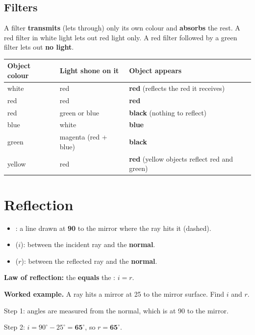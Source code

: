 \documentclass[11pt]{article}
\begin{document}
\subsection*{Filters}
A filter \textbf{transmits} (lets through) only its own colour and \textbf{absorbs} the rest. A red filter in white light lets out red light only. A red filter followed by a green filter lets out \textbf{no light}.
\begin{center}\FigFilter[5mm]\end{center}
\begin{tabularx}{\textwidth}{@{}l l X@{}}
\toprule
\textbf{Object colour} & \textbf{Light shone on it} & \textbf{Object appears}\\
\midrule
white & red & \textbf{red} (reflects the red it receives)\\
red & red & \textbf{red}\\
red & green or blue & \textbf{black} (nothing to reflect)\\
blue & white & \textbf{blue}\\
green & magenta (red + blue) & \textbf{black}\\
yellow & red & \textbf{red} (yellow objects reflect red and green)\\
\bottomrule
\end{tabularx}

\section{Reflection}\label{sec:reflection}
\begin{minipage}[t]{0.52\textwidth}
\vspace{0pt}
\begin{itemize}
\item \textbf{\tNormal}: a line drawn at \textbf{90\textdegree} to the mirror where the ray hits it (dashed).
\item \textbf{\tAoI} ($i$): between the incident ray and the \textbf{normal}.
\item \textbf{\tAoR} ($r$): between the reflected ray and the \textbf{normal}.
\end{itemize}
\textbf{Law of reflection:} the \tAoI{} \textbf{equals} the \tAoR: $i = r$.

\textbf{Worked example.} A ray hits a mirror at 25\textdegree{} to the mirror surface. Find $i$ and $r$.\par
Step 1: angles are measured from the normal, which is at 90\textdegree{} to the mirror.\par
Step 2: $i = 90^\circ - 25^\circ = \mathbf{65^\circ}$, so $r = \mathbf{65^\circ}$.
\end{minipage}\hfill
\begin{minipage}[t]{0.45\textwidth}
\vspace{4pt}\centering
\FigReflect[5.6mm]
\end{minipage}
\end{document}
